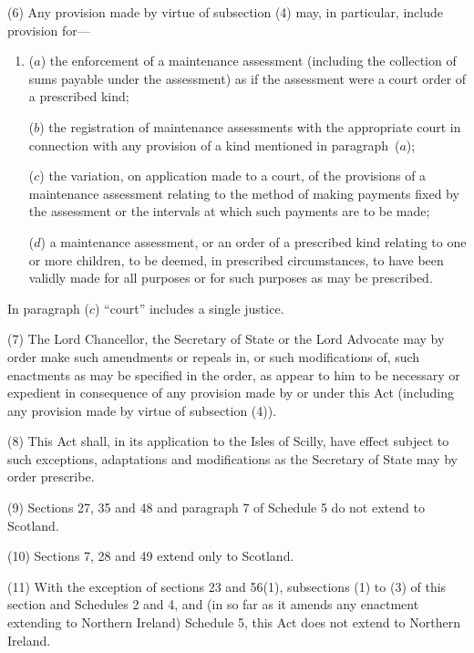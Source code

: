 \documentclass[12pt,a4paper]{article}
\begin{document}
(6) Any provision made by virtue of subsection (4)  may, in particular, include provision for—
\begin{enumerate}\item[]
($a$) the enforcement of a maintenance assessment (including the collection of sums payable under the assessment) as if the assessment were a court order of a prescribed kind;

($b$) the registration of maintenance assessments with the appropriate court in connection with any provision of a kind mentioned in paragraph~($a$);

($c$) the variation, on application made to a court, of the provisions of a maintenance assessment relating to the method of making payments fixed by the assessment or the intervals at which such payments are to be made;

($d$) a maintenance assessment, or an order of a prescribed kind relating to one or more children, to be deemed, in prescribed circumstances, to have been validly made for all purposes or for such purposes as may be prescribed.
\end{enumerate}

In paragraph ($c$)  “court” includes a single justice.

(7) The Lord Chancellor, the Secretary of State or the Lord Advocate may by order make such amendments or repeals in, or such modifications of, such enactments as may be specified in the order, as appear to him to be necessary or expedient in consequence of any provision made by or under this Act (including any provision made by virtue of subsection (4)).

(8) This Act shall, in its application to the Isles of Scilly, have effect subject to such exceptions, adaptations and modifications as the Secretary of State may by order prescribe.

(9) Sections 27, 35 and 48 and paragraph 7 of Schedule 5 do not extend to Scotland.

(10) Sections 7, 28 and 49 extend only to Scotland.

(11) With the exception of sections 23 and 56(1), subsections (1)  to (3)  of this section and Schedules 2 and 4, and (in so far as it amends any enactment extending to Northern Ireland) Schedule 5, this Act does not extend to Northern Ireland.

\end{document}
